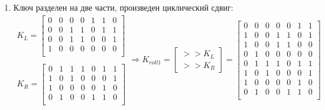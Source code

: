 \documentclass[a4paper, 14pt]{extarticle}
\begin{document}
\begin{enumerate}
    \item Ключ разделен на две части, произведен циклический сдвиг:
    \begin{equation}
        \begin{array}{c}
            K_L = \begin{bmatrix}
                0   & 0   & 0   & 0   & 1   & 1   & 0   \\
                0   & 0   & 1   & 1   & 0   & 1   & 1   \\
                0   & 0   & 1   & 1   & 0   & 0   & 1   \\
                1   & 0   & 0   & 0   & 0   & 0   & 0   \\
            \end{bmatrix}\\
            \\
            K_R = \begin{bmatrix}
                0   & 1   & 1   & 1   & 0   & 1   & 1   \\
                1   & 0   & 1   & 0   & 0   & 0   & 1   \\
                1   & 0   & 0   & 0   & 0   & 1   & 0   \\
                0   & 1   & 0   & 0   & 1   & 1   & 0   \\
            \end{bmatrix}
        \end{array} \Rightarrow{} K_{roll1} = 
        \begin{bmatrix}
            >> K_L\\
            >> K_R
        \end{bmatrix} =
        \begin{bmatrix}
            0   & 0   & 0   & 0   & 0   & 1   & 1   \\
            1   & 0   & 0   & 1   & 1   & 0   & 1   \\
            1   & 0   & 0   & 1   & 1   & 0   & 0   \\
            0   & 1   & 0   & 0   & 0   & 0   & 0   \\
            0   & 1   & 1   & 1   & 0   & 1   & 1   \\
            1   & 0   & 1   & 0   & 0   & 0   & 1   \\
            1   & 0   & 0   & 0   & 0   & 1   & 0   \\
            0   & 1   & 0   & 0   & 1   & 1   & 0   \\
        \end{bmatrix}
    \end{equation}

\end{enumerate}
\end{document}

